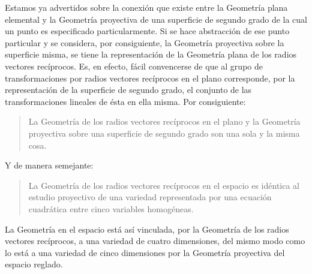 \documentclass[a4paper, 12pt]{article}
\begin{document}
Estamos ya advertidos sobre la conexión que existe entre la Geometría plana elemental y la Geometría proyectiva de una superficie de segundo grado de la cual un punto es especificado particularmente. Si se hace abstracción de ese punto particular y se considera, por consiguiente, la Geometría proyectiva sobre la superficie misma, se tiene la representación de la Geometría plana de los radios vectores recíprocos. Es, en efecto, fácil convencerse de que al grupo de transformaciones por radios vectores recíprocos en el plano corresponde, por la representación de la superficie de segundo grado, el conjunto de las transformaciones lineales de ésta en ella misma. Por consiguiente:

\begin{quote}\it 

La Geometría de los radios vectores recíprocos en el plano y la Geometría proyectiva sobre una superficie de segundo grado son una sola y la misma cosa.

\end{quote}

Y de manera semejante: 

\begin{quote}\it 

La Geometría de los radios vectores recíprocos en el espacio es idéntica al estudio proyectivo de una variedad representada por una ecuación cuadrática entre cinco variables homogéneas.

\end{quote}

La Geometría en el espacio está así vinculada, por la Geometría de los radios vectores recíprocos, a una variedad de cuatro dimensiones, del mismo modo como lo está a una variedad de cinco dimensiones por la Geometría proyectiva del espacio reglado.
\end{document}
